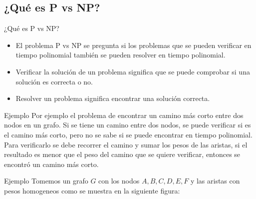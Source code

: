 \documentclass[dvipsnames, 11pt]{beamer}
\theoremstyle{plain}
\theoremstyle{definition}
\begin{document}
\subsection{¿Qué es P vs NP?}
\begin{frame}{¿Qué es P vs NP?}
    \begin{itemize}
        \item El problema P vs NP se pregunta si los problemas que se pueden verificar en tiempo polinomial también se pueden resolver en tiempo polinomial.\pause
        \item Verificar la solución de un problema significa que se puede comprobar si una solución es correcta o no.\pause
        \item Resolver un problema significa encontrar una solución correcta.    
    \end{itemize}
\end{frame}

\begin{frame}{Ejemplo}
    Por ejemplo el problema de encontrar un camino más corto entre dos nodos en un grafo.
        Si se tiene un camino entre dos nodos, se puede verificar si es el camino más corto, pero no se sabe si se puede encontrar en tiempo polinomial.
        Para verificarlo se debe recorrer el camino y sumar los pesos de las aristas, si el resultado es menor que el peso del camino que se quiere verificar, entonces se encontró un camino más corto.
\end{frame}

\begin{frame}{Ejemplo}
    Tomemos un grafo $G$ con los nodos $A,B,C,D,E,F$ y las aristas con pesos homogeneos como se muestra en la siguiente figura:
    \begin{center}
    \end{center}  
\end{frame}
\end{document}
